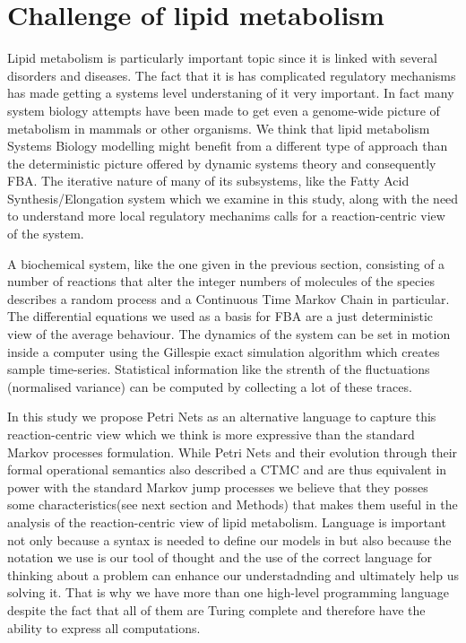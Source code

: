 \section{Challenge of lipid metabolism}
Lipid metabolism is particularly important topic since it is linked
with several disorders and diseases. The fact that it is has
complicated regulatory mechanisms has made getting a systems level
understaning of it very important. In fact many system biology
attempts have been made to get even a genome-wide picture of metabolism in
mammals or other organisms. We think that lipid metabolism Systems
Biology modelling might benefit from a different type of approach than
the deterministic picture offered by dynamic systems theory and
consequently FBA. The iterative nature of many of its subsystems, like
the Fatty Acid Synthesis/Elongation system which we examine in this
study, along with the need to understand more local regulatory
mechanims calls for a reaction-centric view of the system.

A biochemical system, like the one given in the previous section,
consisting of a number of reactions that alter the integer numbers of
molecules of the species describes a random process and a Continuous
Time Markov Chain in particular. The differential equations we used as
a basis for FBA are a just
deterministic view of the average behaviour. The dynamics of the
system can be set in motion inside a computer using the Gillespie
exact simulation algorithm which creates sample
time-series. Statistical information like the strenth of the
fluctuations (normalised variance) can be computed by collecting a lot
of these traces.

In this study we propose Petri Nets as an alternative language to capture this
reaction-centric view which we think is more expressive than the
standard Markov processes formulation. While Petri Nets and their
evolution through their formal operational semantics also described a
CTMC and are thus equivalent in power with the standard Markov jump
processes we believe that they posses some characteristics(see next
section and Methods) that makes them useful in the analysis of the
reaction-centric view of lipid metabolism. Language is important not
only because a syntax is needed to define our models in but also because
the notation we use is our tool of thought and the use of the correct
language for thinking about a problem can enhance our understadnding
and ultimately help us solving it. That is why we have more
than one high-level programming language despite the fact that all of
them are Turing complete and therefore have the ability to express all
computations.

